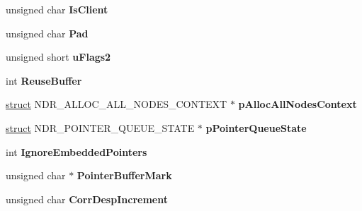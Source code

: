 \begin{DoxyCompactItemize}
unsigned char {\bfseries Is\+Client}
\item 
\mbox{\label{struct___m_i_d_l___s_t_u_b___m_e_s_s_a_g_e_ad0aee25dab247fbe98526269b0cbc8dc}} 
unsigned char {\bfseries Pad}
\item 
\mbox{\label{struct___m_i_d_l___s_t_u_b___m_e_s_s_a_g_e_ae51ed566f400c0236eaf2c7e69daa634}} 
unsigned short {\bfseries u\+Flags2}
\item 
\mbox{\label{struct___m_i_d_l___s_t_u_b___m_e_s_s_a_g_e_a510856e64bb5b3cb993989892bd6d4ea}} 
int {\bfseries Reuse\+Buffer}
\item 
\mbox{\label{struct___m_i_d_l___s_t_u_b___m_e_s_s_a_g_e_ae7a19a20a1790b6300fd7d12214bbaeb}} 
\hyperlink{interfacestruct}{struct} N\+D\+R\+\_\+\+A\+L\+L\+O\+C\+\_\+\+A\+L\+L\+\_\+\+N\+O\+D\+E\+S\+\_\+\+C\+O\+N\+T\+E\+XT $\ast$ {\bfseries p\+Alloc\+All\+Nodes\+Context}
\item 
\mbox{\label{struct___m_i_d_l___s_t_u_b___m_e_s_s_a_g_e_a618a5977c66d762699834c82fa78ee4a}} 
\hyperlink{interfacestruct}{struct} N\+D\+R\+\_\+\+P\+O\+I\+N\+T\+E\+R\+\_\+\+Q\+U\+E\+U\+E\+\_\+\+S\+T\+A\+TE $\ast$ {\bfseries p\+Pointer\+Queue\+State}
\item 
\mbox{\label{struct___m_i_d_l___s_t_u_b___m_e_s_s_a_g_e_a92d234daacab8f44b618f6132eee83ce}} 
int {\bfseries Ignore\+Embedded\+Pointers}
\item 
\mbox{\label{struct___m_i_d_l___s_t_u_b___m_e_s_s_a_g_e_ae7e673715658e062776bc3e55760b081}} 
unsigned char $\ast$ {\bfseries Pointer\+Buffer\+Mark}
\item 
\mbox{\label{struct___m_i_d_l___s_t_u_b___m_e_s_s_a_g_e_a389ed5c503141e7b51fe7430a9bb673e}} 
unsigned char {\bfseries Corr\+Desp\+Increment}
\item 
\mbox{\label{struct___m_i_d_l___s_t_u_b___m_e_s_s_a_g_e_abbc1d08aba068a0b92f06097a7f4bbf4}} 

\end{DoxyCompactItemize}
